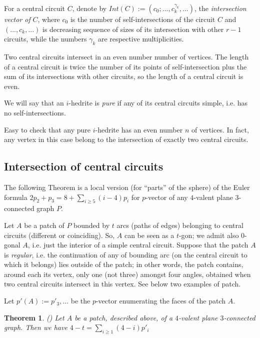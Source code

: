 \documentclass[12pt]{article}
\newtheorem{theor}{Theorem}
\begin{document}
For a central circuit $C$, denote by $Int(C):=(c_0;...,c_k^{\gamma_k},...)$,
the {\em intersection vector of} $C$, where $c_0$ is
the number of self-intersections of the circuit $C$ and $(...,c_k,...)$ is
decreasing sequence of sizes of its intersection with other $r-1$ 
circuits, while the numbers $\gamma_k$ are respective multiplicities.


Two central circuits intersect in an even number number of vertices. 
The length of a central circuit is twice the number of its points of 
self-intersection plus the sum of its intersections with other circuits, 
so the length of a central circuit is even.



We will say that an $i$-hedrite is {\it pure} if any of its central circuits 
simple, i.e. has no self-intersections.


Easy to check that any pure $i$-hedrite has an even number $n$ of 
vertices. In fact, any vertex in this case belong to the intersection 
of exactly two central circuits.




\subsection{Intersection of central circuits}

The following Theorem is a local version (for ``parts'' of the sphere) of
the Euler formula
$2p_2+p_3=8+ \sum_{i\geq 5} (i-4)p_i$ for $p$-vector of any $4$-valent 
plane $3$-connected graph $P$.

Let $A$ be a patch of $P$ bounded by $t$ arcs (paths of edges) belonging to 
central circuits (different or coinciding). So, $A$ can be seen as a 
$t$-gon; we admit also $0$-gonal $A$, i.e.
just the interior of a simple central circuit. Suppose that the patch $A$ is
{\em regular}, i.e.
the continuation of any of bounding arc (on the central circuit to which it
belongs) lies outside of the patch; in other words, the patch
contains, around each its vertex, only one (not three) amongst four angles, 
obtained when two central circuits intersect in this vertex.  See below two 
examples of patch.

\begin{center}
\epsfxsize=60mm
\end{center}

Let $p'(A):=p'_3,...$ be the $p$-vector enumerating the faces of the patch $A$. 

\begin{theor} \label{Local-Euler-Formula}(\cite{DSt})
Let $A$ be a patch, described above, of a $4$-valent plane $3$-connected 
graph. Then we have $4-t=\sum_{i\geq 1} (4-i)p'_i$
\end{theor}
\end{document}
